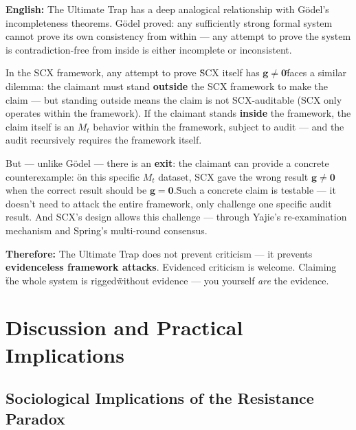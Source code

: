 \documentclass[12pt,a4paper]{article}
\theoremstyle{remark}
\newcommand{\g}{\mathbf{g}}
\begin{document}
\vspace{6pt}
\noindent
\textbf{English:} The Ultimate Trap has a deep analogical relationship with G\"{o}del's incompleteness theorems. G\"{o}del proved: any sufficiently strong formal system cannot prove its own consistency from within — any attempt to prove the system is contradiction-free from inside is either incomplete or inconsistent.

In the SCX framework, any attempt to prove \"SCX itself has $ \g \neq \mathbf{0} $\" faces a similar dilemma: the claimant must stand \textbf{outside} the SCX framework to make the claim — but standing outside means the claim is not SCX-auditable (SCX only operates within the framework). If the claimant stands \textbf{inside} the framework, the claim itself is an $ M_t $ behavior within the framework, subject to audit — and the audit recursively requires the framework itself.

But — unlike G\"{o}del — there is an \textbf{exit}: the claimant can provide a concrete counterexample: \"on this specific $ M_t $ dataset, SCX gave the wrong result $ \g \neq \mathbf{0} $ when the correct result should be $ \g = \mathbf{0} $.\" Such a concrete claim is testable — it doesn't need to attack the entire framework, only challenge one specific audit result. And SCX's design allows this challenge — through Yajie's re-examination mechanism and Spring's multi-round consensus.

\textbf{Therefore:} The Ultimate Trap does not prevent criticism — it prevents \textbf{evidenceless framework attacks}. Evidenced criticism is welcome. Claiming \"the whole system is rigged\" without evidence — you yourself \textit{are} the evidence.

\section{}
\section{Discussion and Practical Implications}

\subsection{}
\subsection{Sociological Implications of the Resistance Paradox}
\end{document}

